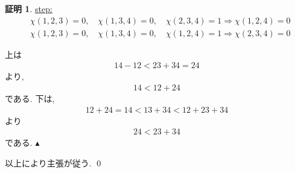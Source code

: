 \documentclass[10pt, fleqn, label-section=none]{bxjsarticle}
\theoremstyle{definition}
\newtheorem*{pf*}{証明}
\newcommand{\naraba}{\Rightarrow}
\renewcommand{\;}{\, ; \,}
\newenvironment{claim}[1]{\par\noindent\underline{step:}\space#1}{}
\newenvironment{claimproof}[1]{\par\noindent{($\because$)}\space#1}{\hfill $\blacktriangle $}
\begin{document}
\begin{pf*}
\begin{claim}
\begin{align*} & \chi (1, 2, 3) = 0, \quad \chi(1, 3, 4) = 0  ,\quad   \chi(2, 3, 4) = 1  \naraba \chi(1, 2, 4) = 0 \\&  \chi (1, 2, 3) = 0, \quad \chi(1, 3, 4) = 0  ,\quad   \chi(1, 2, 4) = 1 \naraba \chi(2, 3, 4) = 0  \end{align*} 

\end{claim}
\begin{claimproof}上は
\begin{align*} 14 - 12 < 23 + 34 = 24 \end{align*}
より, 
\begin{align*} 14 < 12 + 24\end{align*}
である. 下は, 
\begin{align*} 12 + 24 = 14 < 13 + 34 < 12 + 23 + 34\end{align*}
より
\begin{align*} 24 < 23 + 34 \end{align*}
である. 
\end{claimproof}

以上により主張が従う. 
\qed
\end{pf*}
\end{document}
